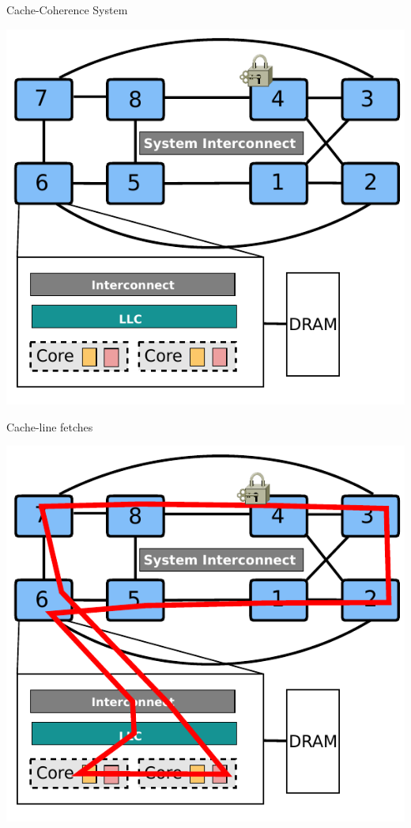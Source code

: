 \documentclass[english]{beamer} %
\begin{document}
\begin{frame}{Cache-Coherence System}
\begin{center}
\includegraphics[scale=0.8]{fig/archcache_2}
\end{center}
\end{frame}

\begin{frame}{Cache-line fetches}
\begin{center}
\includegraphics[scale=0.8]{fig/archcache_3}
\end{center}
\end{frame}
\end{document}
